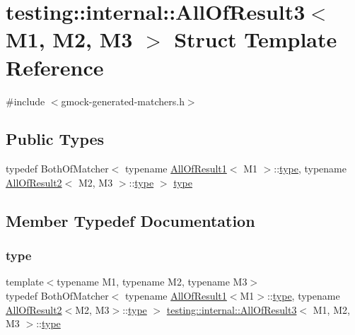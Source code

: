 \hypertarget{structtesting_1_1internal_1_1_all_of_result3}{}\section{testing\+::internal\+::All\+Of\+Result3$<$ M1, M2, M3 $>$ Struct Template Reference}
\label{structtesting_1_1internal_1_1_all_of_result3}


{\ttfamily \#include $<$gmock-\/generated-\/matchers.\+h$>$}

\subsection*{Public Types}
\begin{DoxyCompactItemize}
\item 
typedef Both\+Of\+Matcher$<$ typename \mbox{\hyperlink{structtesting_1_1internal_1_1_all_of_result1}{All\+Of\+Result1}}$<$ M1 $>$\+::\mbox{\hyperlink{structtesting_1_1internal_1_1_all_of_result3_a18073a23acd542bccf3a6c5d7f72f957}{type}}, typename \mbox{\hyperlink{structtesting_1_1internal_1_1_all_of_result2}{All\+Of\+Result2}}$<$ M2, M3 $>$\+::\mbox{\hyperlink{structtesting_1_1internal_1_1_all_of_result3_a18073a23acd542bccf3a6c5d7f72f957}{type}} $>$ \mbox{\hyperlink{structtesting_1_1internal_1_1_all_of_result3_a18073a23acd542bccf3a6c5d7f72f957}{type}}
\end{DoxyCompactItemize}


\subsection{Member Typedef Documentation}
\mbox{\label{structtesting_1_1internal_1_1_all_of_result3_a18073a23acd542bccf3a6c5d7f72f957}} 
\subsubsection{\texorpdfstring{type}{type}}
{\footnotesize\ttfamily template$<$typename M1, typename M2, typename M3$>$ \\
typedef Both\+Of\+Matcher$<$ typename \mbox{\hyperlink{structtesting_1_1internal_1_1_all_of_result1}{All\+Of\+Result1}}$<$M1$>$\+::\mbox{\hyperlink{structtesting_1_1internal_1_1_all_of_result3_a18073a23acd542bccf3a6c5d7f72f957}{type}}, typename \mbox{\hyperlink{structtesting_1_1internal_1_1_all_of_result2}{All\+Of\+Result2}}$<$M2, M3$>$\+::\mbox{\hyperlink{structtesting_1_1internal_1_1_all_of_result3_a18073a23acd542bccf3a6c5d7f72f957}{type}} $>$ \mbox{\hyperlink{structtesting_1_1internal_1_1_all_of_result3}{testing\+::internal\+::\+All\+Of\+Result3}}$<$ M1, M2, M3 $>$\+::\mbox{\hyperlink{structtesting_1_1internal_1_1_all_of_result3_a18073a23acd542bccf3a6c5d7f72f957}{type}}}



